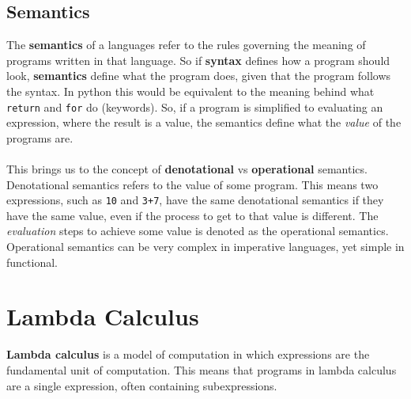 \documentclass{report}
\begin{document}
    \subsection{Semantics}
    The \textbf{semantics} of a languages refer to the rules governing the meaning of programs written in that language. So if \textbf{syntax} defines how a program should look, \textbf{semantics} define what the program does, given that the program follows the syntax. In python this would be equivalent to the meaning behind what \texttt{return} and \texttt{for} do (keywords). So, if a program is simplified to evaluating an expression, where the result is a value, the semantics define what the \textit{value} of the programs are.\\\\
    This brings us to the concept of \textbf{denotational} vs \textbf{operational} semantics. Denotational semantics refers to the value of some program. This means two expressions, such as \texttt{10} and \texttt{3+7}, have the same denotational semantics if they have the same value, even if the process to get to that value is different. The \textit{evaluation} steps to achieve some value is denoted as the operational semantics. Operational semantics can be very complex in imperative languages, yet simple in functional.

    \section{Lambda Calculus}
    \textbf{Lambda calculus} is a model of computation in which expressions are the fundamental unit of computation. This means that programs in lambda calculus are a single expression, often containing subexpressions.

\end{document}
